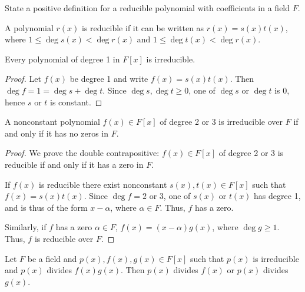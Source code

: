 \documentclass[english,course]{lecture}
\renewcommand{\le}{\leqslant}
\renewcommand{\ge}{\geqslant}
\newenvironment{solution}[1][Solution]{\begin{trivlist}\pushQED{\qed}\item[\hskip \labelsep  \bfseries #1{}.\hspace{10pt}]}{\popQED\end{trivlist}}\renewcommand{\qedsymbol}{$\checkmark$}{\newenvironment{answer}{\renewcommand\qedsymbol{$\blacklozenge$}\begin{proof}[Answer]}{\end{proof}}}\newenvironment{answer}[1][Answer]{\begin{trivlist}\pushQED{\qed}\item[\hskip \labelsep  \bfseries #1{}.\hspace{10pt}]}{\popQED\end{trivlist}}\renewcommand{\qedsymbol}{$\lozenge$}
\newenvironment{facnote}{\startfacnote}{}
\def\startfacnote#1\end{\margintext{{\sc Note:} #1}\end}
\theoremstyle{plain}
\def\presnotes{}
\begin{document}
\begin{exer}
	State a positive definition for a reducible polynomial with coefficients in a field $F$.
\end{exer}

\begin{solution}
	A polynomial $r(x)$ is reducible if it can be written as $r(x) = s(x) t(x)$, where $1 \le \deg s(x) < \deg r(x)$ and $1 \le \deg t(x) < \deg r(x)$.
\end{solution}

\presnotes


\begin{theorem}
	Every polynomial of degree 1 in $F[x]$ is irreducible.
\end{theorem}

\begin{proof}
	Let $f(x)$ be degree 1 and write $f(x) = s(x) t(x)$.
	Then $\deg f = 1 = \deg s + \deg t$.
	Since $\deg s, \deg t \ge 0$, one of $\deg s$ or $\deg t$ is 0, hence $s$ or $t$ is constant.
\end{proof}

\presnotes


\begin{theorem}
	A nonconstant polynomial $f(x)\in F[x]$ of degree 2 or 3 is irreducible over $F$ if and only if it has no zeros in $F$.
\end{theorem}

\begin{proof}
	We prove the double contrapositive: $f(x)\in F[x]$ of degree 2 or 3 is reducible if and only if it has a zero in $F$.
	
	If $f(x)$ is reducible there exist nonconstant $s(x),t(x)\in F[x]$ such that $f(x) = s(x) t(x)$.
	Since $\deg f = 2$ or 3, one of $s(x)$ or $t(x)$ has degree 1, and is thus of the form $x-\alpha$, where $\alpha \in F$.
	Thus, $f$ has a zero.
	
	Similarly, if $f$ has a zero $\alpha\in F$, $f(x) = (x-\alpha)g(x)$, where $\deg g \ge 1$. 
	Thus, $f$ is reducible over $F$.
\end{proof}

\presnotes

\begin{theorem}
	Let $F$ be a field and $p(x),f(x),g(x)\in F[x]$ such that $p(x)$ is irreducible and $p(x)$ divides $f(x) g(x)$.
	Then $p(x)$ divides $f(x)$ or $p(x)$ divides $g(x)$.
\end{theorem}
\end{document}
